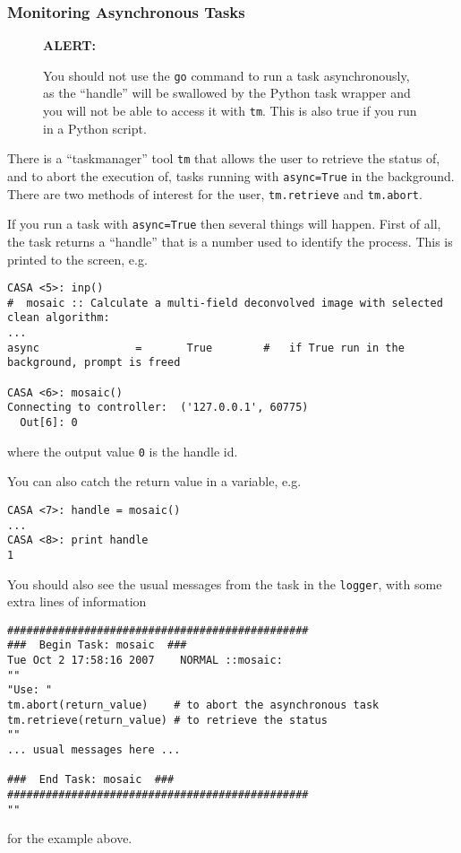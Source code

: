 \subsubsection{Monitoring Asynchronous Tasks}
\label{section:intro.tasks.async.tm}


\begin{wrapfigure}{r}{2.5in}
  \begin{boxedminipage}{2.5in}
     \centerline{\bf ALERT:}
     You should not use the {\tt go} command to run a task
     asynchronously, as the ``handle'' will be swallowed by
     the Python task wrapper and you will not be able to
     access it with {\tt tm}.  This is also true if you run
     in a Python script.
  \end{boxedminipage}
\end{wrapfigure}

There is a ``taskmanager'' tool {\tt tm} that allows the user
to retrieve the status of, and to abort the execution of, tasks
running with {\tt async=True} in the background.  There
are two methods of interest for the user, {\tt tm.retrieve} and
{\tt tm.abort}.

If you run a task with {\tt async=True} then several things will
happen.  First of all, the task returns a ``handle'' that is 
a number used to identify the process.  This is printed to the 
screen, e.g. 
\small
\begin{verbatim}
CASA <5>: inp()
#  mosaic :: Calculate a multi-field deconvolved image with selected clean algorithm:
...
async               =       True        #   if True run in the background, prompt is freed

CASA <6>: mosaic()
Connecting to controller:  ('127.0.0.1', 60775)
  Out[6]: 0
\end{verbatim}
\normalsize
where the output value {\tt 0} is the handle id.  

You can also catch the return value in a variable, e.g.
\small
\begin{verbatim}
CASA <7>: handle = mosaic()
...
CASA <8>: print handle
1
\end{verbatim}
\normalsize
You should also see the usual messages from the task in the 
{\tt logger}, with some extra lines of information
\small
\begin{verbatim}
###############################################
###  Begin Task: mosaic  ###
Tue Oct 2 17:58:16 2007    NORMAL ::mosaic:
""
"Use: "
tm.abort(return_value)    # to abort the asynchronous task
tm.retrieve(return_value) # to retrieve the status
""
... usual messages here ...

###  End Task: mosaic  ###
###############################################
""
\end{verbatim}
\normalsize
for the example above.

